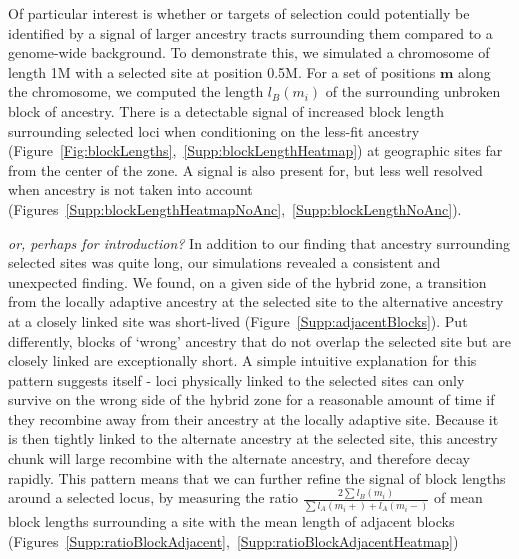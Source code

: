 \documentclass[12pt]{article}
\newcommand{\plr}[1]{{\em \color{blue} #1}}
\begin{document}
Of particular interest is whether or targets of selection could potentially be identified by a signal of larger ancestry tracts surrounding them compared to a genome-wide background. To demonstrate this, we simulated a chromosome of length 1M with a selected site at position 0.5M. For a set of positions $\mathbf{m}$ along the chromosome, we computed the length $l_B(m_i)$
of the surrounding unbroken block of ancestry. There is a detectable signal of increased block length surrounding selected loci when conditioning on the less-fit ancestry (Figure~\ref{Fig:blockLengths},~\ref{Supp:blockLengthHeatmap}) at geographic sites far from the center of the zone. A signal is also present for, but less well resolved when ancestry is not taken into account (Figures~\ref{Supp:blockLengthHeatmapNoAnc},~\ref{Supp:blockLengthNoAnc}).

\plr{or, perhaps for introduction?}
In addition to our finding that ancestry surrounding selected sites was quite long, our simulations revealed a consistent and unexpected finding. We found, on a given side of the hybrid zone, a transition from the locally adaptive ancestry at the selected site to the alternative ancestry at a closely linked site was short-lived (Figure~\ref{Supp:adjacentBlocks}). Put differently, blocks of `wrong' ancestry that do not overlap the selected site but are closely linked are exceptionally short. A simple intuitive explanation for this pattern suggests itself - loci physically linked to the selected sites can only survive on the wrong side of the hybrid zone for a reasonable amount of time if they recombine away from their ancestry at the locally adaptive site. Because it is then tightly linked to the alternate ancestry at the selected site, this ancestry chunk will large recombine with the alternate ancestry, and therefore decay rapidly. This pattern means that we can further refine the signal of block lengths around a selected locus, by measuring the ratio $\frac{2\sum{l_B(m_i)}}{\sum{l_A(m_i+)+l_A(m_i-)}}$ of mean block lengths surrounding a site with the mean length of adjacent blocks (Figures~\ref{Supp:ratioBlockAdjacent},~\ref{Supp:ratioBlockAdjacentHeatmap})
\end{document}
